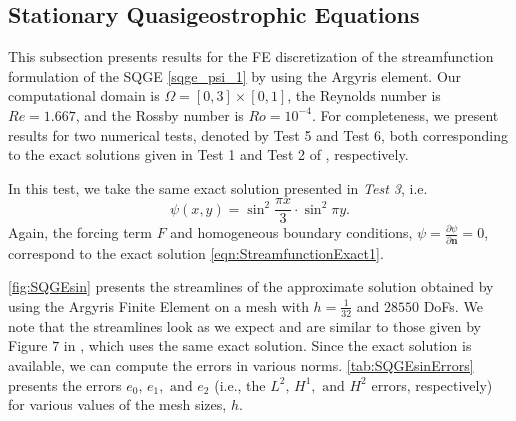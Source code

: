 \subsection{Stationary Quasigeostrophic Equations}\label{sse:SQGE}
This subsection presents results for the FE discretization of the streamfunction formulation of the
SQGE \eqref{sqge_psi_1} by using the Argyris element. Our computational domain is
$\Omega=[0,3]\times[0,1]$, the Reynolds number is $Re=1.667$, and the Rossby number is $Ro=10^{-4}$.
For completeness, we present results for two numerical tests, denoted by Test 5 and Test 6, both
corresponding to the exact solutions given in Test 1 and Test 2 of \cite{Cascon}, respectively.

In this test, we take the same exact solution presented in \emph{Test 3}, i.e.
\begin{equation}
  \psi(x,y) = \sin^2 \frac{\pi x}{3} \cdot \sin^2 \pi y.
  \label{eqn:StreamfunctionExact1}
\end{equation}
Again, the forcing term $F$ and homogeneous boundary conditions, $\psi = \frac{\partial
\psi}{\partial \mathbf{n}} = 0$, correspond to the exact solution \eqref{eqn:StreamfunctionExact1}. 

\autoref{fig:SQGEsin} presents the streamlines of the approximate solution obtained by using the
Argyris Finite Element on a mesh with $h=\frac{1}{32}$ and $28550$ DoFs. We note that the
streamlines look as we expect and are similar to those given by Figure $7$ in \cite{Myers}, which
uses the same exact solution.  Since the exact solution is available, we can compute the errors in
various norms. \autoref{tab:SQGEsinErrors} presents the errors $e_0,\, e_1, \text{ and } e_2$ (i.e.,
the $L^2,\, H^1, \text{ and } H^2$ errors, respectively) for various values of the mesh sizes, $h$.

